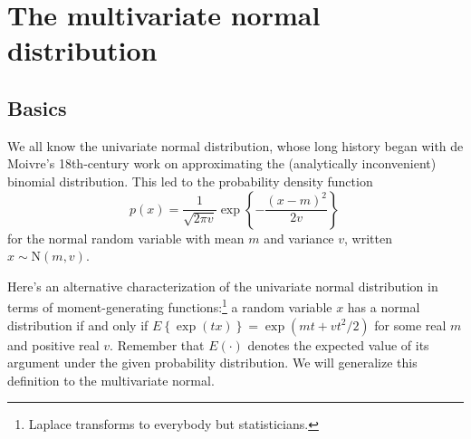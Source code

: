 \documentclass{mynotes}
\newcommand{\N}{\mbox{N}}
\begin{document}
\section{The multivariate normal distribution}

\subsection{Basics}

We all know the univariate normal distribution, whose long history began with de Moivre's 18th-century work on approximating the (analytically inconvenient) binomial distribution.  This led to the probability density function
$$
p(x) = \frac{1}{\sqrt{2 \pi v}} \exp \left\{ - \frac{(x-m)^2}{2 v} \right\} \, 
$$
for the normal random variable with mean $m$ and variance $v$, written $x \sim \N(m, v)$.

Here's an alternative characterization of the univariate normal distribution in terms of moment-generating functions:\footnote{Laplace transforms to everybody but statisticians.} a random variable $x$ has a normal distribution if and only if $E \left\{ \exp(tx) \right\} = \exp(mt + v t^2 /2)$ for some real $m$ and positive real $v$.  Remember that $E(\cdot)$ denotes the expected value of its argument under the given probability distribution.  We will generalize this definition to the multivariate normal.
\end{document}
